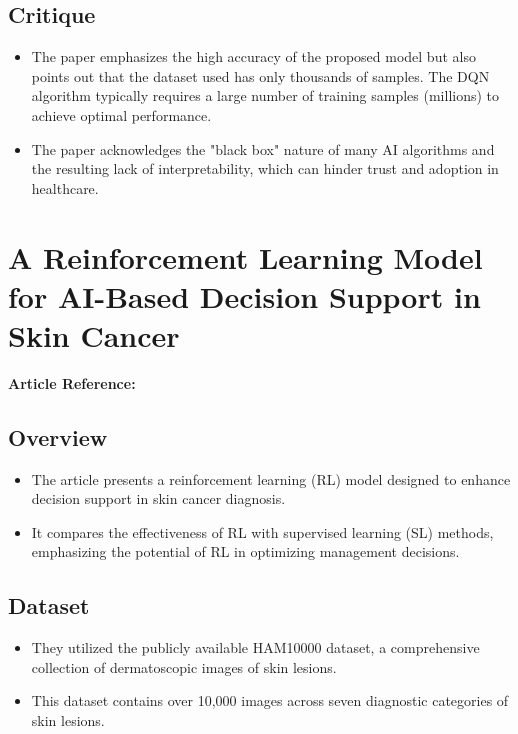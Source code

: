 \subsection*{Critique}
\begin{itemize}
    \item The paper emphasizes the high accuracy of the proposed model but also points out that the dataset used has only thousands of samples. The DQN algorithm typically requires a large number of training samples (millions) to achieve optimal performance.
    \item The paper acknowledges the "black box" nature of many AI algorithms and the resulting lack of interpretability, which can hinder trust and adoption in healthcare.
\end{itemize}

\section{A Reinforcement Learning Model for AI-Based Decision Support in Skin Cancer}
\textbf{Article Reference:} \cite{article_11}

\subsection*{Overview}
\begin{itemize}
    \item The article presents a reinforcement learning (RL) model designed to enhance decision support in skin cancer diagnosis.
    \item It compares the effectiveness of RL with supervised learning (SL) methods, emphasizing the potential of RL in optimizing management decisions.
\end{itemize}

\subsection*{Dataset}
\begin{itemize}
    \item They utilized the publicly available HAM10000 dataset, a comprehensive collection of dermatoscopic images of skin lesions.
    \item This dataset contains over 10,000 images across seven diagnostic categories of skin lesions.
\end{itemize}

